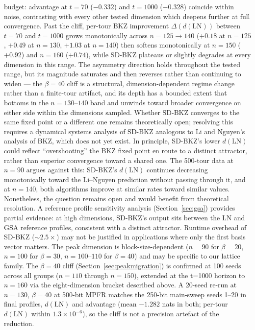 \documentclass[journal=cic,version=preprint]{iacrj}
\begin{document}
budget: advantage at $t=70$ ($-0.332$) and $t=1000$ ($-0.328$) coincide within noise, contrasting with every other tested dimension which deepens further at full convergence. Past the cliff, per-tour BKZ improvement $\Delta(d(\mathrm{LN}))$ between $t=70$ and $t=1000$ grows monotonically across $n=125 \to 140$ ($+0.18$ at $n=125$, $+0.49$ at $n=130$, $+1.03$ at $n=140$) then softens monotonically at $n=150$ ($+0.92$) and $n=160$ ($+0.74$), while SD-BKZ plateaus or slightly degrades at every dimension in this range. The asymmetry direction holds throughout the tested range, but its magnitude saturates and then reverses rather than continuing to widen --- the $\beta=40$ cliff is a structural, dimension-dependent regime change rather than a finite-tour artifact, and its depth has a bounded extent that bottoms in the $n=130$--$140$ band and unwinds toward broader convergence on either side within the dimensions sampled. Whether SD-BKZ converges to the same fixed point or a different one remains theoretically open; resolving this requires a dynamical systems analysis of SD-BKZ analogous to Li and Nguyen's analysis of BKZ, which does not yet exist. In principle, SD-BKZ's lower $d(\mathrm{LN})$ could reflect ``overshooting'' the BKZ fixed point en route to a distinct attractor, rather than superior convergence toward a shared one. The 500-tour data at $n=90$ argues against this: SD-BKZ's $d(\mathrm{LN})$ continues decreasing monotonically toward the Li--Nguyen prediction without passing through it, and at $n=140$, both algorithms improve at similar rates toward similar values. Nonetheless, the question remains open and would benefit from theoretical resolution. A reference profile sensitivity analysis (Section~\ref{sec:gsa}) provides partial evidence: at high dimensions, SD-BKZ's output sits between the LN and GSA reference profiles, consistent with a distinct attractor. Runtime overhead of SD-BKZ (${\sim}2.5\times$) may not be justified in applications where only the first basis vector matters. The peak dimension is block-size-dependent ($n=90$ for $\beta=20$, $n=100$ for $\beta=30$, $n=100$--$110$ for $\beta=40$) and may be specific to our lattice family. The $\beta=40$ cliff (Section~\ref{sec:peakmigration}) is confirmed at 100 seeds across all groups ($n=110$ through $n=150$), extended at the t=1000 horizon to $n=160$ via the eight-dimension bracket described above. A 20-seed re-run at $n=130$, $\beta=40$ at 500-bit MPFR matches the 250-bit main-sweep seeds 1--20 in final profiles, $d(\mathrm{LN})$ and advantage (mean $-1.282$ nats in both; per-tour $d(\mathrm{LN})$ within $1.3\times10^{-6}$), so the cliff is not a precision artefact of the reduction.
\end{document}
